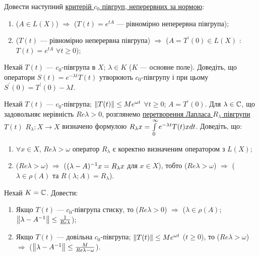 
\begin{exercise}
    Довести наступний \ul{критерій $c_0$ півгруп, неперервних за 
    нормою}:
    \begin{enumerate}
        \item ($A \in L(X)$) $\Rightarrow$ ($T(t) = e^{tA}$ 
        --- рівномірно неперервна півгрупа);
        \item ($T(t)$ --- рівномірно неперервна півгрупа) $\Rightarrow$ 
        ($A = T^{\prime}(0) \in L(X)$ : $T(t) = e^{tA}$ $\forall t \geq 0$);
    \end{enumerate}
\end{exercise}

\begin{exercise}
    Нехай $T(t)$ --- $c_0$-півгрупа в $X$; $\lambda \in K$ ($K$ --- основне поле). Доведіть, 
    що оператори $S(t) = e^{-\lambda t}T(t)$ утворюють $c_0$-півгрупу і при цьому 
    $S^{\prime}(0) = T^{\prime}(0) - \lambda I$. 
\end{exercise}

\begin{exercise}
    Нехай $T(t)$ --- $c_0$-півгрупа; $\left\lVert T(t)\right\rVert \leq Me^{\omega t}$ $\forall t \geq 0$;
    $A = T^{\prime}(0)$. Для $\lambda \in \mathbb{C}$, що задовольняє нерівність $Re\lambda > 0$,
    розглянемо \ul{перетворення Лапласа $R_\lambda$ півгрупи $T(t)$} $R_\lambda : 
    X \rightarrow X$ визначено формулою $R_\lambda x = \int\limits_{0}^{\infty}e^{-\lambda t} T(t)
    x dt$. Доведіть, що:
    \begin{enumerate}
        \item $\forall x \in X$, $Re \lambda > \omega$ оператор 
        $R_\lambda$ є коректно визначеним оператором з $L(X)$;
        \item ($Re \lambda > \omega$) $\Rightarrow$ ($(\lambda - A)^{-1}x = R_\lambda x$ 
        для $x \in X$), тобто ($Re \lambda > \omega$) $\Rightarrow$ ($\lambda \in \rho(A)$
        та $R(\lambda; A) = R_\lambda$).
    \end{enumerate}
\end{exercise}

\begin{exercise}
    Нехай $K = \mathbb{C}$. Довести:
    \begin{enumerate}
        \item Якщо $T(t)$ --- $c_0$-півгрупа стиску, то ($Re\lambda > 0$) $\Rightarrow$
        ($\lambda \in \rho(A)$; $\left\lVert\lambda - A^{-1}\right\rVert \leq \frac{1}{Re \lambda}$);
        \item Якщо $T(t)$ --- довільна $c_0$-півгрупа; $\left\lVert T(t)\right\rVert \leq Me^{\omega t}$ 
        ($t \geq 0$), то ($Re \lambda > \omega$) $\Rightarrow$ 
        ($\left\lVert\lambda - A^{-1}\right\rVert \leq \frac{M}{Re\lambda - \omega}$).
    \end{enumerate}
\end{exercise}

